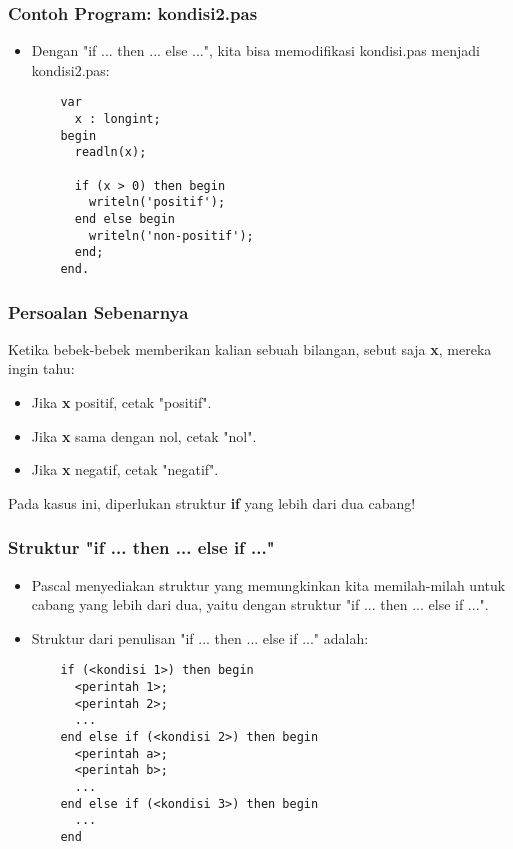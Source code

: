 \documentclass{beamer}
\begin{document}
\begin{frame}[fragile]
\frametitle{Contoh Program: kondisi2.pas}
\begin{itemize}
  \item Dengan "if ... then ... else ...", kita bisa memodifikasi kondisi.pas menjadi kondisi2.pas:
  \begin{lstlisting}
    var
      x : longint;
    begin
      readln(x);

      if (x > 0) then begin
        writeln('positif');
      end else begin
        writeln('non-positif');
      end;
    end.
  \end{lstlisting}
\end{itemize}
\end{frame}

\begin{frame}
\frametitle{Persoalan Sebenarnya}
Ketika bebek-bebek memberikan kalian sebuah bilangan, sebut saja \textbf{x}, mereka ingin tahu:
\begin{itemize}
  \item Jika \textbf{x} positif, cetak "positif".
  \item Jika \textbf{x} sama dengan nol, cetak "nol".
  \item Jika \textbf{x} negatif, cetak "negatif".
\end{itemize}

Pada kasus ini, diperlukan struktur \textbf{if} yang lebih dari dua cabang!
\end{frame}

\begin{frame}[fragile]
\frametitle{Struktur "if ... then ... else if ..."}
\begin{itemize}
  \item Pascal menyediakan struktur yang memungkinkan kita memilah-milah untuk cabang yang lebih dari dua, yaitu dengan struktur "if ... then ... else if ...".
  \item Struktur dari penulisan "if ... then ... else if ..." adalah:
  \begin{lstlisting}
    if (<kondisi 1>) then begin
      <perintah 1>;
      <perintah 2>;
      ...
    end else if (<kondisi 2>) then begin
      <perintah a>;
      <perintah b>;
      ...
    end else if (<kondisi 3>) then begin
      ...
    end
  \end{lstlisting}

\end{itemize}
\end{frame}
\end{document}
